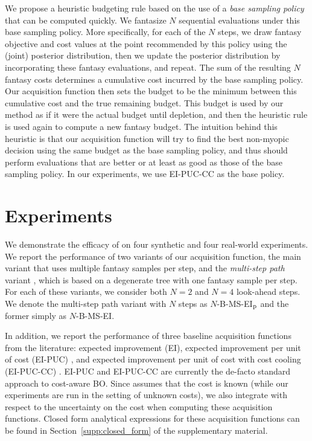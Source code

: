 We propose a heuristic budgeting rule based on the use of a \textit{base sampling policy} that can be computed quickly. We fantasize $N$ sequential evaluations under this base sampling policy. More specifically, for each of the $N$ steps, we draw fantasy objective and cost values at the point recommended by this policy using the (joint) posterior distribution, then we update the posterior distribution by incorporating these fantasy evaluations, and repeat. The sum of the resulting $N$ fantasy costs determines a cumulative cost incurred by the base sampling policy. Our acquisition function then sets the budget to be the minimum between this cumulative cost and the true remaining budget. This budget is used by our method as if it were the actual budget until depletion, and then the heuristic rule is used again to compute a new fantasy budget. The intuition behind this heuristic is that our acquisition function will try to find the best non-myopic decision using the same budget as the base sampling policy, and thus should perform evaluations that are better or at least as good as those of the base sampling policy. In our experiments, we use EI-PUC-CC as the base policy.

\section{Experiments}
\label{sec:experiments}
We demonstrate the efficacy of \BMSEI{} on four synthetic and four real-world experiments. We report the performance of two variants of our acquisition function, the main variant that uses multiple fantasy samples per step, and the \textit{multi-step path} variant \citep{jiang2020efficient}, which is based on a degenerate tree with one fantasy sample per step. For each of these variants, we consider both $N=2$ and $N=4$ look-ahead steps. We denote the multi-step path variant with $N$ steps as $N$-B-MS-EI$_{\textnormal{p}}$ and the former simply as $N$-B-MS-EI.

In addition, we report the performance of three baseline acquisition functions from the literature: expected improvement (EI), expected improvement per unit of cost (EI-PUC) \citep{Snoek2012ML, lee2020cost}, and  expected improvement per unit of cost with cost cooling (EI-PUC-CC) \citep{lee2020cost}. EI-PUC and EI-PUC-CC are currently the de-facto standard approach to cost-aware BO. Since \cite{lee2020cost} assumes that the cost is known (while our experiments are run in the setting of unknown costs), we also integrate with respect to the uncertainty on the cost when computing these acquisition functions. Closed form analytical expressions for these acquisition functions can be found in Section~\ref{supp:closed_form} of the supplementary material.


